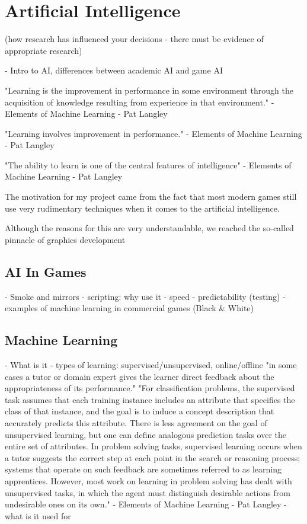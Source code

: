 \documentclass[a4paper,oneside]{report}
\begin{document}
\chapter{Artificial Intelligence}

(how research has influenced your decisions - there must be evidence of appropriate research)

- Intro to AI, differences between academic AI and game AI

"Learning is the improvement in performance in some environment through the acquisition of knowledge resulting from experience in that environment." - Elements of Machine Learning - Pat Langley

"Learning involves improvement in performance." - Elements of Machine Learning - Pat Langley

"The ability to learn is one of the central features of intelligence" - Elements of Machine Learning - Pat Langley

The motivation for my project came from the fact that most modern games still use very rudimentary techniques when it comes to the artificial intelligence.

Although the reasons for this are very understandable, we reached the so-called pinnacle of graphics development 


\section{AI In Games}
- Smoke and mirrors
- scripting: why use it
	- speed
	- predictability (testing) 
- examples of machine learning in commercial games (Black \& White)

\section{Machine Learning}

- What is it
- types of learning: supervised/unsupervised, online/offline
"in some cases a tutor or domain expert gives the learner direct feedback about the appropriateness of its performance."
"For classification problems, the supervised task assumes that each training instance includes an attribute that specifies the class of that instance, and the goal is to induce a concept description that accurately predicts this attribute. There is less agreement on the goal of unsupervised learning, but one can define analogous prediction tasks over the entire set of attributes. In problem solving tasks, supervised learning occurs when a tutor suggests the correct step at each point in the search or reasoning process; systems that operate on such feedback are sometimes referred to as learning apprentices. However, most work on learning in problem solving has dealt with unsupervised tasks, in which the agent must distinguish desirable actions from undesirable ones on its own." - Elements of Machine Learning - Pat Langley
- what is it used for 
\end{document}
